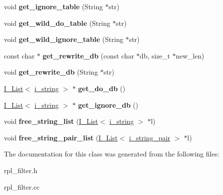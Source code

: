 \begin{DoxyCompactItemize}
\item 
\mbox{\label{classRpl__filter_acf06857660c3748b9f8310ebb21678b3}} 
void {\bfseries get\+\_\+ignore\+\_\+table} (String $\ast$str)
\item 
\mbox{\label{classRpl__filter_a160578a682c9bc352959aacdfd2f9a7a}} 
void {\bfseries get\+\_\+wild\+\_\+do\+\_\+table} (String $\ast$str)
\item 
\mbox{\label{classRpl__filter_ab85ca17a8152910d734c79eb628b480f}} 
void {\bfseries get\+\_\+wild\+\_\+ignore\+\_\+table} (String $\ast$str)
\item 
\mbox{\label{classRpl__filter_a5308f2a91dec66ef4bae100e175b9c1b}} 
const char $\ast$ {\bfseries get\+\_\+rewrite\+\_\+db} (const char $\ast$db, size\+\_\+t $\ast$new\+\_\+len)
\item 
\mbox{\label{classRpl__filter_a0fee7e8b81b8c5bf9cc8ed312833e4c9}} 
void {\bfseries get\+\_\+rewrite\+\_\+db} (String $\ast$str)
\item 
\mbox{\label{classRpl__filter_a2e2814ae63b54372944b1e81fe916b39}} 
\mbox{\hyperlink{classI__List}{I\+\_\+\+List}}$<$ \mbox{\hyperlink{classi__string}{i\+\_\+string}} $>$ $\ast$ {\bfseries get\+\_\+do\+\_\+db} ()
\item 
\mbox{\label{classRpl__filter_a652a0af6a44d8638e35eafd46dcc991c}} 
\mbox{\hyperlink{classI__List}{I\+\_\+\+List}}$<$ \mbox{\hyperlink{classi__string}{i\+\_\+string}} $>$ $\ast$ {\bfseries get\+\_\+ignore\+\_\+db} ()
\item 
\mbox{\label{classRpl__filter_a25e562b091e4a7e27a8b0f88defe7c50}} 
void {\bfseries free\+\_\+string\+\_\+list} (\mbox{\hyperlink{classI__List}{I\+\_\+\+List}}$<$ \mbox{\hyperlink{classi__string}{i\+\_\+string}} $>$ $\ast$l)
\item 
\mbox{\label{classRpl__filter_a1547302ed759d997cdb094d253a15779}} 
void {\bfseries free\+\_\+string\+\_\+pair\+\_\+list} (\mbox{\hyperlink{classI__List}{I\+\_\+\+List}}$<$ \mbox{\hyperlink{classi__string__pair}{i\+\_\+string\+\_\+pair}} $>$ $\ast$l)
\end{DoxyCompactItemize}


The documentation for this class was generated from the following files\+:\begin{DoxyCompactItemize}
\item 
rpl\+\_\+filter.\+h\item 
rpl\+\_\+filter.\+cc\end{DoxyCompactItemize}
